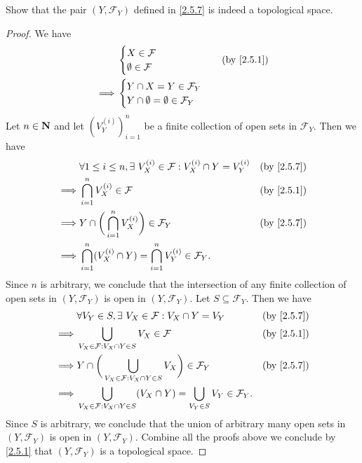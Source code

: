 \begin{exercise}\label{ex 2.5.12}
  Show that the pair \((Y, \mathcal{F}_Y)\) defined in \cref{2.5.7} is indeed a topological space.
\end{exercise}

\begin{proof}
  We have
  \begin{align*}
             & \begin{cases}
                 X \in \mathcal{F} \\
                 \emptyset \in \mathcal{F}
               \end{cases}                      & \text{(by \cref{2.5.1})} \\
    \implies & \begin{cases}
                 Y \cap X = Y \in \mathcal{F}_Y \\
                 Y \cap \emptyset = \emptyset \in \mathcal{F}_Y
               \end{cases}
  \end{align*}
  Let \(n \in \mathbf{N}\) and let \((V_Y^{(i)})_{i = 1}^n\) be a finite collection of open sets in \(\mathcal{F}_Y\).
  Then we have
  \begin{align*}
             & \forall 1 \leq i \leq n, \exists\ V_X^{(i)} \in \mathcal{F} : V_X^{(i)} \cap Y = V_Y^{(i)} & \text{(by \cref{2.5.7})} \\
    \implies & \bigcap_{i = 1}^n V_X^{(i)} \in \mathcal{F}                                                & \text{(by \cref{2.5.1})} \\
    \implies & Y \cap \bigg(\bigcap_{i = 1}^n V_X^{(i)}\bigg) \in \mathcal{F}_Y                           & \text{(by \cref{2.5.7})} \\
    \implies & \bigcap_{i = 1}^n (V_X^{(i)} \cap Y) = \bigcap_{i = 1}^n V_Y^{(i)} \in \mathcal{F}_Y.
  \end{align*}
  Since \(n\) is arbitrary, we conclude that the intersection of any finite collection of open sets in \((Y, \mathcal{F}_Y)\) is open in \((Y, \mathcal{F}_Y)\).
  Let \(S \subseteq \mathcal{F}_Y\).
  Then we have
  \begin{align*}
             & \forall V_Y \in S, \exists\ V_X \in \mathcal{F} : V_X \cap Y = V_Y                                         & \text{(by \cref{2.5.7})} \\
    \implies & \bigcup_{V_X \in \mathcal{F} : V_X \cap Y \in S} V_X \in \mathcal{F}                                       & \text{(by \cref{2.5.1})} \\
    \implies & Y \cap \bigg(\bigcup_{V_X \in \mathcal{F} : V_X \cap Y \in S} V_X\bigg) \in \mathcal{F}_Y                  & \text{(by \cref{2.5.7})} \\
    \implies & \bigcup_{V_X \in \mathcal{F} : V_X \cap Y \in S} (V_X \cap Y) = \bigcup_{V_Y \in S} V_Y \in \mathcal{F}_Y.
  \end{align*}
  Since \(S\) is arbitrary, we conclude that the union of arbitrary many open sets in \((Y, \mathcal{F}_Y)\) is open in \((Y, \mathcal{F}_Y)\).
  Combine all the proofs above we conclude by \cref{2.5.1} that \((Y, \mathcal{F}_Y)\) is a topological space.
\end{proof}

